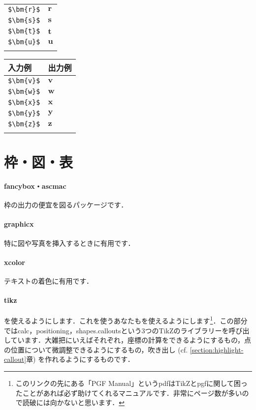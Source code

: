 \documentclass[uplatex]{jsreport}
\begin{document}
\begin{table}[htbp]
\begin{tabular}{ll}
    \verb|$\bm{r}$| & $\bm{r}$ \\
    \verb|$\bm{s}$| & $\bm{s}$ \\
    \verb|$\bm{t}$| & $\bm{t}$ \\
    \verb|$\bm{u}$| & $\bm{u}$ \\\\\hline
  \end{tabular}
  \begin{tabular}{ll}\hline
    入力例 & 出力例 \\ \hline
    \verb|$\bm{v}$| & $\bm{v}$ \\
    \verb|$\bm{w}$| & $\bm{w}$ \\
    \verb|$\bm{x}$| & $\bm{x}$ \\
    \verb|$\bm{y}$| & $\bm{y}$ \\
    \verb|$\bm{z}$| & $\bm{z}$ \\\\\hline
  \end{tabular}
\end{table}\par

\section{枠・図・表}\label{section:frfigtab}
\paragraph{fancybox・ascmac} 枠の出力の便宜を図るパッケージです\cite{fancybox,ascmac}．
\paragraph{graphicx} 特に図や写真を挿入するときに有用です\cite{graphicx}．
\paragraph{xcolor} テキストの着色に有用です\cite{xcolor}．
\paragraph{tikz} {\TikZ}を使えるようにします．これを使うあなたも{\TikZ}を使えるようにします\cite{pgf}\footnote{このリンクの先にある「PGF Manual」というpdfはTikZとpgfに関して困ったことがあれば必ず助けてくれるマニュアルです．非常にページ数が多いので読破には向かないと思います．}．この部分ではcalc，positioning，shapes.calloutsという3つのTikZのライブラリーを呼び出しています．大雑把にいえばそれぞれ，座標の計算をできるようにするもの，点の位置について微調整できるようにするもの，吹き出し (cf. \ref{section:highlight-callout}章) を作れるようにするものです．
\end{document}
